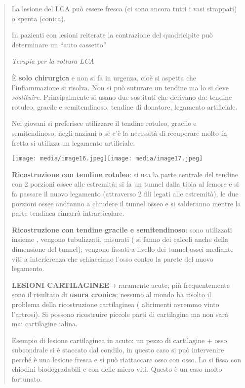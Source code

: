 \documentclass[]{article}
\begin{document}
\begin{quote}
La lesione del LCA può essere fresca (ci sono ancora tutti i vasi
strappati) o spenta (conica).

In pazienti con lesioni reiterate la contrazione del quadricipite può
determinare un ``auto cassetto''

\emph{Terapia per la rottura LCA}

È \textbf{solo chirurgica} e non si fa in urgenza, cioè si aspetta che
l'infiammazione si risolva. Non si può suturare un tendine ma lo si deve
\emph{sostituire}. Principalmente si usano due sostituti che derivano
da: tendine rotuleo, gracile e semitendinoso, tendine di donatore,
legamento artificiale.

Nei giovani si preferisce utilizzare il tendine rotuleo, gracile e
semitendinoso; negli anziani o se c'è la necessità di recuperare molto
in fretta si utilizza un legamento artificiale\textbf{. }

\texttt{[image: media/image16.jpeg]}\texttt{[image: media/image17.jpeg]}

\textbf{Ricostruzione con tendine rotuleo}: si usa la parte centrale del
tendine con 2 porzioni ossee alle estremità; si fa un tunnel dalla tibia
al femore e si fa passare il nuovo legamento (attraverso 2 fili legati
alle estremità), le due porzioni ossee andranno a chiudere il tunnel
osseo e si salderanno mentre la parte tendinea rimarrà intrarticolare.

\textbf{Ricostruzione con tendine gracile e semitendinoso}: sono
utilizzati insieme , vengono tubulizzati, misurati ( si fanno dei
calcoli anche della dimensione del tunnel); vengono fissati a livello
dei tunnel ossei mediante viti a interferenza che schiacciano l'osso
contro la parete del nuovo legamento.

\textbf{LESIONI CARTILAGINEE}→ raramente acute; più frequentemente sono
il risultato di \textbf{usura cronica}; nessuno al mondo ha risolto il
problema della ricostruzione cartilaginea ( altrimenti avremmo vinto
l'artrosi). Si possono ricostruire piccole parti di cartilagine ma non
sarà mai cartilagine ialina.

Esempio di lesione cartilaginea in acuto: un pezzo di cartilagine + osso
subcondrale si è staccato dal condilo, in questo caso si può intervenire
perché è una lesione fresca e si può riattaccare osso con osso. Lo si
fissa con chiodini biodegradabili e con delle micro viti. Questo è un
caso molto fortunato.


\end{quote}
\end{document}
